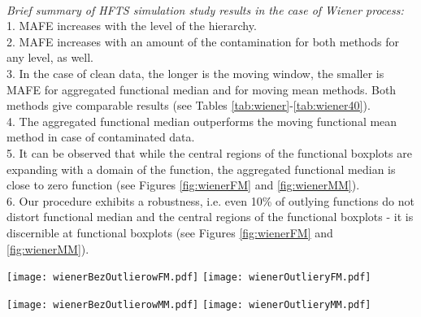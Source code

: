 \documentclass[12pt,a4paper]{article}
\numberwithin{equation}{section}
\begin{document}
\\ \textit{Brief summary of HFTS simulation study results in the case of Wiener process:}
\\ 1. MAFE increases with the level of the hierarchy. 
\\ 2. MAFE increases with an amount of the contamination for both methods for any level, as well.
\\ 3. In the case of clean data, the longer is the moving window, the smaller is MAFE for aggregated functional median and for moving mean methods. Both methods give comparable results (see Tables \ref{tab:wiener}-\ref{tab:wiener40}). 
\\ 4. The aggregated functional median outperforms the moving functional mean method in case of contaminated data.
\\ 5. It can be observed that while the central regions of the functional boxplots are expanding with a domain of the function, the aggregated functional median is close to zero function (see Figures \ref{fig:wienerFM} and \ref{fig:wienerMM}). 
\\ 6. Our procedure exhibits a robustness, i.e. even 10\% of outlying functions do not distort functional median and the central regions of the functional boxplots - it is discernible at functional boxplots (see Figures \ref{fig:wienerFM} and \ref{fig:wienerMM}).  
\begin{figure*}
\texttt{[image: wienerBezOutlierowFM.pdf]}
\texttt{[image: wienerOutlieryFM.pdf]}
\caption{Functional boxplots for prediction errors for the top level of the Wiener HFTS, without outliers (left) and with 10\% shape outliers (right). Aggregated functional median method has been applied, window length $k=10$, \textit{DepthProc} R package.}
\label{fig:wienerFM}
\end{figure*}
\begin{figure*}
\texttt{[image: wienerBezOutlierowMM.pdf]}
\texttt{[image: wienerOutlieryMM.pdf]}
\caption{Functional boxplots for prediction errors for the top level of the Wiener HFTS, without outliers (left) and with 10\% shape outliers (right). 
Moving mean method has been applied, window length $k=10$, \textit{DepthProc} R package.}
\label{fig:wienerMM}
\end{figure*}
\end{document}
